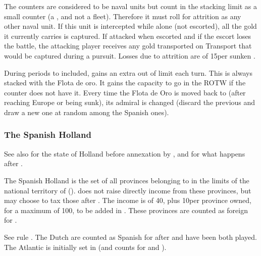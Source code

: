 \aparag The counters are considered to be naval units but count in the
stacking limit as a small counter (a \DT, and not a fleet).
\bparag Therefore it must roll for attrition as any other naval unit. If
this unit is intercepted while alone (not escorted), all the gold it
currently carries is captured.
\bparag If attacked when escorted and if the escort loses the battle,
the attacking player receives any gold transported on Transport that
would be captured during a pursuit.
\bparag Losses due to attrition are of 15\ducats per sunken \NTD.

\aparag[] [BLP] During periods  to  included,
\HIS gains an extra \anonyme\LeaderA out of limit each turn.
\bparag This \anonyme\LeaderA is always stacked with the Flota de
oro. It gains the capacity to go in the ROTW if the counter does not
have it.
\bparag Every time the Flota de Oro is moved back to
 (after reaching Europe or being sunk), its admiral
is changed (discard the previous \anonyme\LeaderA and draw a new one
at random among the Spanish ones).

\subsubsection{The Spanish Holland}\label{chSpecific:Spain:Spanish Holland}
\aparag See also  for the state of Holland before
annexation by \SPA, and  for what
happens after .

 \label{chSpecific:Spain:Dutch Tax} The Spanish
Holland is the set of all provinces belonging to \SPA in the limits of
the national territory of 
(). \SPA does not raise directly income
from these provinces, but may choose to tax those after
.
\bparag The income is of 40\ducats, plus 10\ducats per province owned,
for a maximum of 100\ducats, to be added in .
\bparag These provinces are counted as foreign for
.

 See rule .
\bparag The Dutch \TradeFLEET are counted as Spanish for
 after  and
 have been both played. The Atlantic
 is initially set in  (and
counts for  and ).
%

